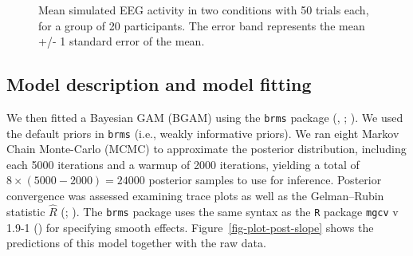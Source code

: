 \documentclass[
  doc,
  floatsintext,
  longtable,
  a4paper,
  nolmodern,
  notxfonts,
  notimes,
  donotrepeattitle,
  colorlinks=true,linkcolor=blue,citecolor=blue,urlcolor=blue]{apa7}
\begin{document}
\begin{figure}[!htb]

\caption{\label{fig-eeg}Mean simulated EEG activity in two conditions
with 50 trials each, for a group of 20 participants. The error band
represents the mean +/- 1 standard error of the mean.}


\end{figure}%

\subsection{Model description and model
fitting}\label{model-description-and-model-fitting}

We then fitted a Bayesian GAM (BGAM) using the \texttt{brms} package
(, ;
). We used the
default priors in \texttt{brms} (i.e., weakly informative priors). We
ran eight Markov Chain Monte-Carlo (MCMC) to approximate the posterior
distribution, including each 5000 iterations and a warmup of 2000
iterations, yielding a total of \(8 \times (5000-2000) = 24000\)
posterior samples to use for inference. Posterior convergence was
assessed examining trace plots as well as the Gelman--Rubin statistic
\(\hat{R}\) (;
). The \texttt{brms}
package uses the same syntax as the \texttt{R} package \texttt{mgcv} v
1.9-1 () for specifying smooth effects.
Figure~\ref{fig-plot-post-slope} shows the predictions of this model
together with the raw data.
\end{document}
